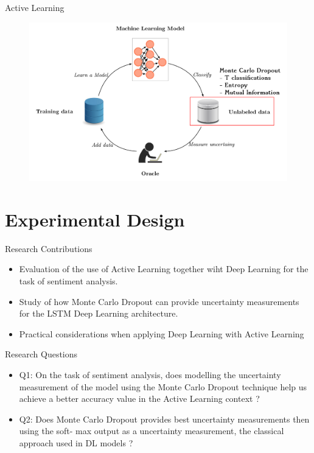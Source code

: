 \documentclass[10pt]{beamer}
\begin{document}
\begin{frame}[fragile]{Active Learning}
    \begin{figure}[htp]
        \centering
        \includegraphics[scale=0.3]{images/active_learning_uncertainty_dropout.png}
    \end{figure}
\end{frame}

\section{Experimental Design}

\begin{frame}[fragile]{Research Contributions}
\begin{itemize}
\item Evaluation of the use of Active Learning together wiht Deep Learning for the task
      of sentiment analysis.
\item Study of how Monte Carlo Dropout can provide uncertainty measurements for the LSTM Deep
      Learning architecture.
\item Practical considerations when applying Deep Learning with Active Learning
\end{itemize}
\end{frame}

\begin{frame}[fragile]{Research Questions}
\begin{itemize}
    \item \alert{Q1}: On the task of sentiment analysis, does modelling the uncertainty measurement of the
    model using the Monte Carlo Dropout technique help us achieve a better accuracy value in
    the Active Learning context ?
    \vspace{0.5cm}
    \item \alert{Q2}: Does Monte Carlo Dropout
    provides best uncertainty measurements then using the soft-
    max output as a uncertainty measurement, the classical approach used in DL models ?
\end{itemize}
\end{frame}
\end{document}
